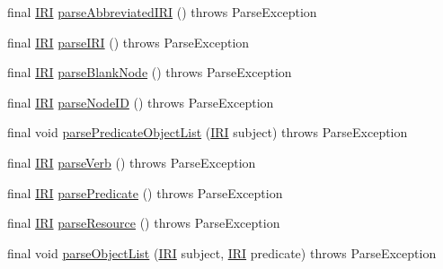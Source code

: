 \begin{DoxyCompactItemize}
final \hyperlink{classorg_1_1semanticweb_1_1owlapi_1_1model_1_1_i_r_i}{I\-R\-I} \hyperlink{classuk_1_1ac_1_1manchester_1_1cs_1_1owl_1_1owlapi_1_1turtle_1_1parser_1_1_turtle_parser_afaf01d59cf407a0f7f34703042c81235}{parse\-Abbreviated\-I\-R\-I} ()  throws Parse\-Exception 
\item 
final \hyperlink{classorg_1_1semanticweb_1_1owlapi_1_1model_1_1_i_r_i}{I\-R\-I} \hyperlink{classuk_1_1ac_1_1manchester_1_1cs_1_1owl_1_1owlapi_1_1turtle_1_1parser_1_1_turtle_parser_a71a7635d7a78f37a0ce91652d8d51ad6}{parse\-I\-R\-I} ()  throws Parse\-Exception 
\item 
final \hyperlink{classorg_1_1semanticweb_1_1owlapi_1_1model_1_1_i_r_i}{I\-R\-I} \hyperlink{classuk_1_1ac_1_1manchester_1_1cs_1_1owl_1_1owlapi_1_1turtle_1_1parser_1_1_turtle_parser_a161fd509397e8e3340cb7a9a1e28ff64}{parse\-Blank\-Node} ()  throws Parse\-Exception 
\item 
final \hyperlink{classorg_1_1semanticweb_1_1owlapi_1_1model_1_1_i_r_i}{I\-R\-I} \hyperlink{classuk_1_1ac_1_1manchester_1_1cs_1_1owl_1_1owlapi_1_1turtle_1_1parser_1_1_turtle_parser_a6e9ba3fbc2c61682df7f67efa2d51cfc}{parse\-Node\-I\-D} ()  throws Parse\-Exception 
\item 
final void \hyperlink{classuk_1_1ac_1_1manchester_1_1cs_1_1owl_1_1owlapi_1_1turtle_1_1parser_1_1_turtle_parser_a472ed56b24965f9a6eb20eed8fbd5d7e}{parse\-Predicate\-Object\-List} (\hyperlink{classorg_1_1semanticweb_1_1owlapi_1_1model_1_1_i_r_i}{I\-R\-I} subject)  throws Parse\-Exception 
\item 
final \hyperlink{classorg_1_1semanticweb_1_1owlapi_1_1model_1_1_i_r_i}{I\-R\-I} \hyperlink{classuk_1_1ac_1_1manchester_1_1cs_1_1owl_1_1owlapi_1_1turtle_1_1parser_1_1_turtle_parser_a79063843bf275f88492bc987c4b3bccb}{parse\-Verb} ()  throws Parse\-Exception 
\item 
final \hyperlink{classorg_1_1semanticweb_1_1owlapi_1_1model_1_1_i_r_i}{I\-R\-I} \hyperlink{classuk_1_1ac_1_1manchester_1_1cs_1_1owl_1_1owlapi_1_1turtle_1_1parser_1_1_turtle_parser_aca332c3b9372e198c4e91718a98e8e6c}{parse\-Predicate} ()  throws Parse\-Exception 
\item 
final \hyperlink{classorg_1_1semanticweb_1_1owlapi_1_1model_1_1_i_r_i}{I\-R\-I} \hyperlink{classuk_1_1ac_1_1manchester_1_1cs_1_1owl_1_1owlapi_1_1turtle_1_1parser_1_1_turtle_parser_a415aefc3fdc9aae5a39768b3c14fcf18}{parse\-Resource} ()  throws Parse\-Exception 
\item 
final void \hyperlink{classuk_1_1ac_1_1manchester_1_1cs_1_1owl_1_1owlapi_1_1turtle_1_1parser_1_1_turtle_parser_a015cbef3d84fb7117183df393e961c1f}{parse\-Object\-List} (\hyperlink{classorg_1_1semanticweb_1_1owlapi_1_1model_1_1_i_r_i}{I\-R\-I} subject, \hyperlink{classorg_1_1semanticweb_1_1owlapi_1_1model_1_1_i_r_i}{I\-R\-I} predicate)  throws Parse\-Exception 

\end{DoxyCompactItemize}
